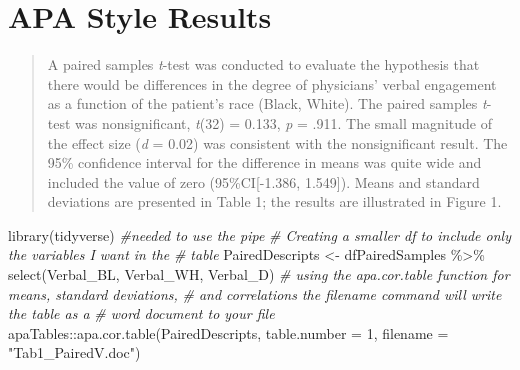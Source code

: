 \documentclass[
  11pt,
]{book}
\newenvironment{Shaded}{\begin{snugshade}}{\end{snugshade}}
\newcommand{\AttributeTok}[1]{\textcolor[rgb]{0.77,0.63,0.00}{#1}}
\newcommand{\CommentTok}[1]{\textcolor[rgb]{0.56,0.35,0.01}{\textit{#1}}}
\newcommand{\DecValTok}[1]{\textcolor[rgb]{0.00,0.00,0.81}{#1}}
\newcommand{\FunctionTok}[1]{\textcolor[rgb]{0.00,0.00,0.00}{#1}}
\newcommand{\NormalTok}[1]{#1}
\newcommand{\OtherTok}[1]{\textcolor[rgb]{0.56,0.35,0.01}{#1}}
\newcommand{\SpecialCharTok}[1]{\textcolor[rgb]{0.00,0.00,0.00}{#1}}
\newcommand{\StringTok}[1]{\textcolor[rgb]{0.31,0.60,0.02}{#1}}
\begin{document}
\hypertarget{apa-style-results-2}{%
\section{APA Style Results}\label{apa-style-results-2}}

\begin{quote}
A paired samples \emph{t}-test was conducted to evaluate the hypothesis that there would be differences in the degree of physicians' verbal engagement as a function of the patient's race (Black, White). The paired samples \emph{t}-test was nonsignificant, \emph{t}(32) = 0.133, \emph{p} = .911. The small magnitude of the effect size (\emph{d} = 0.02) was consistent with the nonsignificant result. The 95\% confidence interval for the difference in means was quite wide and included the value of zero (95\%CI{[}-1.386, 1.549{]}). Means and standard deviations are presented in Table 1; the results are illustrated in Figure 1.
\end{quote}

\begin{Shaded}
\begin{Highlighting}[]
\FunctionTok{library}\NormalTok{(tidyverse)  }\CommentTok{\#needed to use the pipe }
\CommentTok{\# Creating a smaller df to include only the variables I want in the}
\CommentTok{\# table}
\NormalTok{PairedDescripts }\OtherTok{\textless{}{-}}\NormalTok{ dfPairedSamples }\SpecialCharTok{\%\textgreater{}\%}
    \FunctionTok{select}\NormalTok{(Verbal\_BL, Verbal\_WH, Verbal\_D)}
\CommentTok{\# using the apa.cor.table function for means, standard deviations,}
\CommentTok{\# and correlations the filename command will write the table as a}
\CommentTok{\# word document to your file}
\NormalTok{apaTables}\SpecialCharTok{::}\FunctionTok{apa.cor.table}\NormalTok{(PairedDescripts, }\AttributeTok{table.number =} \DecValTok{1}\NormalTok{, }\AttributeTok{filename =} \StringTok{"Tab1\_PairedV.doc"}\NormalTok{)}
\end{Highlighting}
\end{Shaded}
\end{document}
